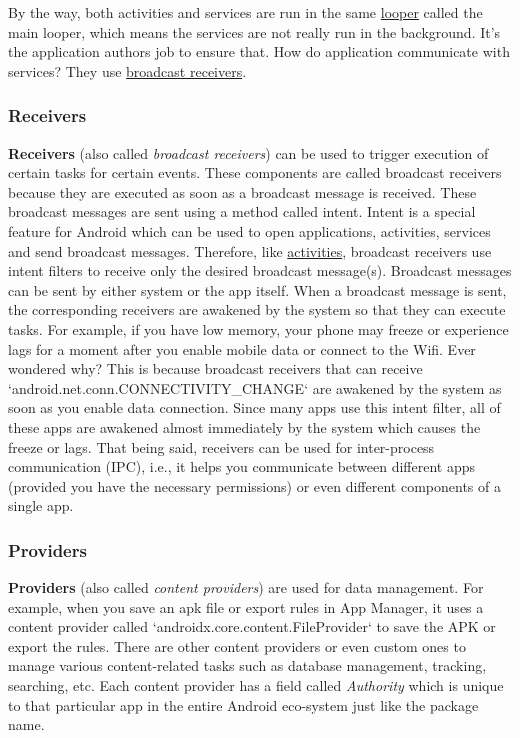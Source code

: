 By the way, both activities and services are run in the same \href{https://stackoverflow.com/questions/7597742}{looper}
called the main looper, which means the services are not really run in the background. It's the application authors job
to ensure that. How do application communicate with services? They use
\hyperref[subsubsec:app-details-receivers]{broadcast receivers}.

\subsubsection{Receivers}\label{subsubsec:app-details-receivers}
\textbf{Receivers} (also called \textit{broadcast receivers}) can be used to trigger execution of certain tasks for
certain events. These components are called broadcast receivers because they are executed as soon as a broadcast message
is received. These broadcast messages are sent using a method called intent. Intent is a special feature for Android
which can be used to open applications, activities, services and send broadcast messages. Therefore, like
\hyperref[subsubsec:activities]{activities}, broadcast receivers use intent filters to receive only the desired
broadcast message(s). Broadcast messages can be sent by either system or the app itself. When a broadcast message is
sent, the corresponding receivers are awakened by the system so that they can execute tasks. For example, if you have
low memory, your phone may freeze or experience lags for a moment after you enable mobile data or connect to the Wifi.
Ever wondered why? This is because broadcast receivers that can receive `android.net.conn.CONNECTIVITY\_CHANGE` are
awakened by the system as soon as you enable data connection. Since many apps use this intent filter, all of these apps
are awakened almost immediately by the system which causes the freeze or lags. That being said, receivers can be used
for inter-process communication (IPC), i.e., it helps you communicate between different apps (provided you have the
necessary permissions) or even different components of a single app.

\subsubsection{Providers}\label{appdetails:providers}
\textbf{Providers} (also called \textit{content providers}) are used for data management. For example, when you save an
apk file or export rules in App Manager, it uses a content provider called `androidx.core.content.FileProvider` to save
the APK or export the rules. There are other content providers or even custom ones to manage various content-related
tasks such as database management, tracking, searching, etc. Each content provider has a field called \textit{Authority}
which is unique to that particular app in the entire Android eco-system just like the package name.


